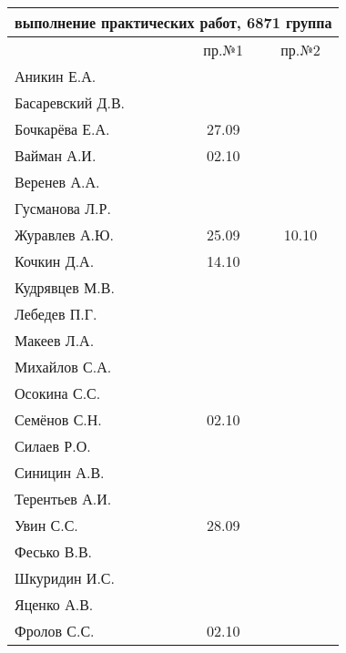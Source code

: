 \documentclass[a4paper,11pt]{article}
\begin{document}
\begin{tabular}{l|cc}
\multicolumn{3}{c}{выполнение практических работ, 6871 группа} \\
\toprule
& пр.№1 & пр.№2 \\
\midrule
Аникин Е.А.     &     &\\    
Басаревский Д.В.&     &\\
Бочкарёва Е.А.  &27.09&\\
Вайман А.И.     &02.10&\\
Веренев А.А.    &     &\\
Гусманова Л.Р.  &     &\\
Журавлев А.Ю.   &25.09&10.10\\
Кочкин Д.А.     &14.10&\\
Кудрявцев М.В.  &     &\\
Лебедев П.Г.    &     &\\
Макеев Л.А.     &     &\\
Михайлов С.А.   &     &\\
Осокина С.С.    &     &\\
Семёнов С.Н.    &02.10&\\
Силаев Р.О.     &     &\\
Синицин А.В.    &     &\\
Терентьев А.И.  &     &\\
Увин С.С.       &28.09&\\
Фесько В.В.     &     &\\
Шкуридин И.С.   &     &\\
Яценко А.В.     &     &\\
Фролов С.С.     &02.10&\\
\bottomrule
\end{tabular}
\end{document}
